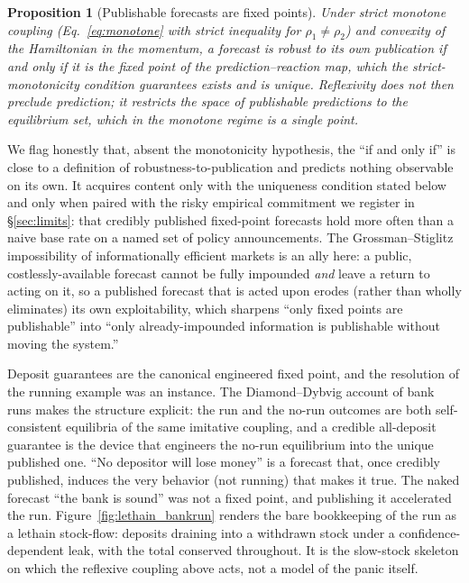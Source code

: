 \documentclass[11pt]{article}
\newtheorem{proposition}{Proposition}
\begin{document}
\begin{proposition}[Publishable forecasts are fixed points]
\label{prop:fixedpoint}
Under \emph{strict} monotone coupling (Eq.~\eqref{eq:monotone} with strict inequality for $\rho_1\neq\rho_2$) and convexity of the Hamiltonian in the momentum, a forecast is robust to its own publication if and only if it is the fixed point of the prediction--reaction map, which the strict-monotonicity condition guarantees exists and is unique. Reflexivity does not then preclude prediction; it restricts the space of publishable predictions to the equilibrium set, which in the monotone regime is a single point.
\end{proposition}

We flag honestly that, absent the monotonicity hypothesis, the ``if and only if'' is close to a definition of robustness-to-publication and predicts nothing observable on its own. It acquires content only with the uniqueness condition stated below and only when paired with the risky empirical commitment we register in \S\ref{sec:limits}: that credibly published fixed-point forecasts hold more often than a naive base rate on a named set of policy announcements. The Grossman--Stiglitz impossibility of informationally efficient markets \cite{grossmanstiglitz1980} is an ally here: a public, costlessly-available forecast cannot be fully impounded \emph{and} leave a return to acting on it, so a published forecast that is acted upon erodes (rather than wholly eliminates) its own exploitability, which sharpens ``only fixed points are publishable'' into ``only already-impounded information is publishable without moving the system.''

Deposit guarantees are the canonical engineered fixed point, and the resolution of the running example was an instance. The Diamond--Dybvig account of bank runs \cite{diamonddybvig1983} makes the structure explicit: the run and the no-run outcomes are both self-consistent equilibria of the same imitative coupling, and a credible all-deposit guarantee is the device that engineers the no-run equilibrium into the unique published one. ``No depositor will lose money'' is a forecast that, once credibly published, induces the very behavior (not running) that makes it true. The naked forecast ``the bank is sound'' was not a fixed point, and publishing it accelerated the run. Figure~\ref{fig:lethain_bankrun} renders the bare bookkeeping of the run as a lethain stock-flow: deposits draining into a withdrawn stock under a confidence-dependent leak, with the total conserved throughout. It is the slow-stock skeleton on which the reflexive coupling above acts, not a model of the panic itself.
\end{document}
